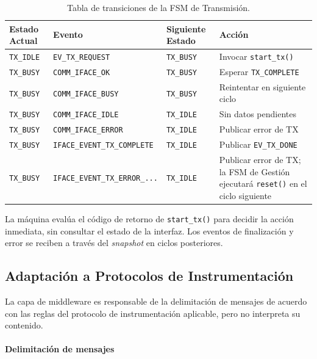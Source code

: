 \begin{table}[htbp]
    \centering
    \caption{Tabla de transiciones de la FSM de Transmisión.}
    \label{tab:fsm-tx}
    \begin{tabular}{llll}
        \toprule
        \textbf{Estado Actual} & \textbf{Evento} & \textbf{Siguiente Estado} & \textbf{Acción} \\
        \midrule
        \texttt{TX\_IDLE} & \texttt{EV\_TX\_REQUEST} & \texttt{TX\_BUSY} & Invocar \texttt{start\_tx()} \\
        \texttt{TX\_BUSY} & \texttt{COMM\_IFACE\_OK} & \texttt{TX\_BUSY} & Esperar \texttt{TX\_COMPLETE} \\
        \texttt{TX\_BUSY} & \texttt{COMM\_IFACE\_BUSY} & \texttt{TX\_BUSY} & Reintentar en siguiente ciclo \\
        \texttt{TX\_BUSY} & \texttt{COMM\_IFACE\_IDLE} & \texttt{TX\_IDLE} & Sin datos pendientes \\
        \texttt{TX\_BUSY} & \texttt{COMM\_IFACE\_ERROR} & \texttt{TX\_IDLE} & Publicar error de TX \\
        \texttt{TX\_BUSY} & \texttt{IFACE\_EVENT\_TX\_COMPLETE} & \texttt{TX\_IDLE} & Publicar \texttt{EV\_TX\_DONE} \\
        \texttt{TX\_BUSY} & \texttt{IFACE\_EVENT\_TX\_ERROR\_...} & \texttt{TX\_IDLE} & Publicar error de TX; la FSM de Gestión ejecutará \texttt{reset()} en el ciclo siguiente \\
        \bottomrule
    \end{tabular}
\end{table}

La máquina evalúa el código de retorno de \texttt{start\_tx()} para decidir la acción inmediata, sin consultar el estado de la interfaz. Los eventos de finalización y error se reciben a través del \textit{snapshot} en ciclos posteriores.

\subsection{Adaptación a Protocolos de Instrumentación}
\label{subsec:adaptacion-protocolos}

La capa de middleware es responsable de la delimitación de mensajes de acuerdo con las reglas del protocolo de instrumentación aplicable, pero no interpreta su contenido.

\paragraph{Delimitación de mensajes}

